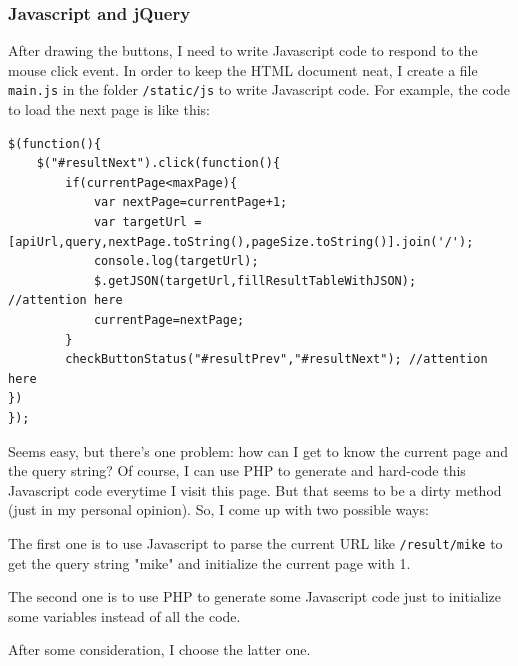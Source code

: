 \documentclass[a4paper]{article}
\begin{document}
            \subsubsection{Javascript and jQuery}
After drawing the buttons, I need to write Javascript code to respond to the mouse click event. In order to keep the HTML document neat, I create a file \texttt{main.js} in the folder \texttt{/static/js} to write Javascript code. For example, the code to load the next page is like this:
\begin{verbatim}
$(function(){
    $("#resultNext").click(function(){
        if(currentPage<maxPage){
            var nextPage=currentPage+1;
            var targetUrl = [apiUrl,query,nextPage.toString(),pageSize.toString()].join('/');
            console.log(targetUrl);
            $.getJSON(targetUrl,fillResultTableWithJSON);   //attention here
            currentPage=nextPage;
        }
        checkButtonStatus("#resultPrev","#resultNext"); //attention here
})
});
\end{verbatim}
Seems easy, but there's one problem: how can I get to know the current page and the query string? Of course, I can use PHP to generate and hard-code this Javascript code everytime I visit this page. But that seems to be a dirty method (just in my personal opinion). So, I come up with two possible ways:

The first one is to use Javascript to parse the current URL like \texttt{/result/mike} to get the query string "mike" and initialize the current page with 1.

The second one is to use PHP to generate some Javascript code just to initialize some variables instead of all the code.

After some consideration, I choose the latter one.
\end{document}
